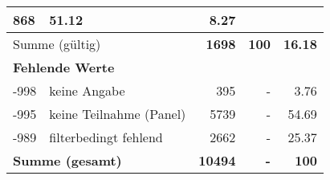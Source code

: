 \begin{longtable}{lXrrr}
       \num{868} &
       \num[round-mode=places,round-precision=2]{51.12} &
         \num[round-mode=places,round-precision=2]{8.27} \\
     \midrule
     \multicolumn{2}{l}{Summe (gültig)} &
       \textbf{\num{1698}} &
     \textbf{\num{100}} &
       \textbf{\num[round-mode=places,round-precision=2]{16.18}} \\
     \multicolumn{5}{l}{\textbf{Fehlende Werte}}\\
       -998 &
       keine Angabe &
         \num{395} &
        - &
         \num[round-mode=places,round-precision=2]{3.76} \\
       -995 &
       keine Teilnahme (Panel) &
         \num{5739} &
        - &
         \num[round-mode=places,round-precision=2]{54.69} \\
       -989 &
       filterbedingt fehlend &
         \num{2662} &
        - &
         \num[round-mode=places,round-precision=2]{25.37} \\
     \midrule
     \multicolumn{2}{l}{\textbf{Summe (gesamt)}} &
          \textbf{\num{10494}} &
        \textbf{-} &
        \textbf{\num{100}} \\
     \bottomrule
     \end{longtable}
     
